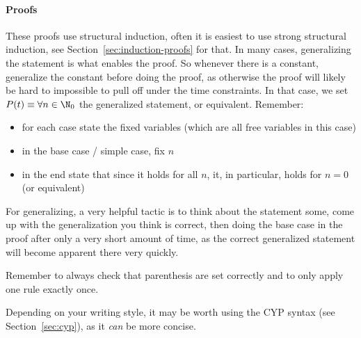 \paragraph{Proofs}
These proofs use structural induction, often it is easiest to use strong structural induction, see Section~\ref{sec:induction-proofs} for that.
In many cases, generalizing the statement is what enables the proof. So whenever there is a constant, generalize the constant before doing the proof,
as otherwise the proof will likely be hard to impossible to pull off under the time constraints.
In that case, we set $P(t) \equiv \forall n \in \N_0$ the generalized statement, or equivalent.
Remember:
\begin{itemize}
    \item for each case state the fixed variables (which are all free variables in this case)
    \item in the base case / simple case, fix $n$
    \item in the end state that since it holds for all $n$, it, in particular, holds for $n = 0$ (or equivalent)
\end{itemize}
For generalizing, a very helpful tactic is to think about the statement some, come up with the generalization you think is correct, then doing the base case in the proof
after only a very short amount of time, as the correct generalized statement will become apparent there very quickly.

Remember to always check that parenthesis are set correctly and to only apply one rule exactly once.

Depending on your writing style, it may be worth using the CYP syntax (see Section~\ref{sec:cyp}), as it \textit{can} be more concise.
